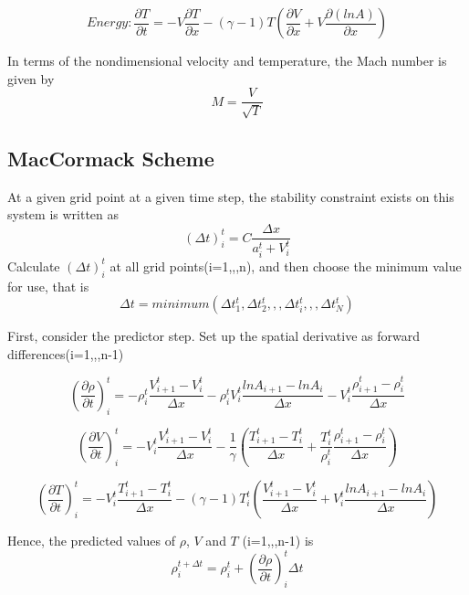 \begin{equation}
Energy: \frac{\partial T}{\partial t} = -V\frac{\partial T}{\partial x}-(\gamma -1)T( \frac{\partial V}{\partial x}+V\frac{\partial(ln A)}{\partial x} )
\end{equation}

In terms of the nondimensional velocity and temperature, the Mach number is given by
\begin{equation}
M = \frac{V}{\sqrt {T}}
\end{equation}

\subsection{MacCormack Scheme}

At a given grid point at a given time step, the stability constraint exists on this system is written as
\begin{equation}
(\Delta t)^t_i = C \frac{\Delta x}{a^t_i+V^t_i}
\end{equation}
Calculate $(\Delta t)^t_i$ at all grid points(i=1,,,n), and then choose the minimum value for use, that is
\begin{equation}
\Delta t =minimum( \Delta t^t_1, \Delta t^t_2,,, \Delta t^t_i,,,\Delta t^t_N )
\end{equation}

First, consider the predictor step. Set up the spatial derivative as forward differences(i=1,,,n-1)

\begin{equation}
(\frac{\partial \rho}{\partial t})^t_i=-\rho^t_i \frac{V^t_{i+1}-V^t_i}{\Delta x}-\rho^t_i V^t_i \frac{ln A_{i+1}-ln A_i}{\Delta x} -V^t_i \frac{\rho^t_{i+1} - \rho^t_i}{\Delta x}
\end{equation}

\begin{equation}
(\frac{\partial V}{\partial t})^t_i=-V^t_i \frac{V^t_{i+1}-V^t_i}{\Delta x}-\frac{1}{\gamma}( \frac{T^t_{i+1}-T^t_i}{\Delta x}+\frac{T^t_i}{\rho^t_i}\frac{\rho^t_{i+1}-\rho^t_i}{\Delta x}  )
\end{equation}

\begin{equation}
(\frac{\partial T}{\partial t})^t_i = -V^t_i \frac{T^t_{i+1}-T^t_i}{\Delta x}-(\gamma-1)T^t_i(\frac{V^t_{i+1}-V^t_i}{\Delta x}+V^t_i \frac{ln A_{i+1} - ln A_i}{\Delta x})
\end{equation}

Hence, the predicted values of $\rho$, $V$ and $T$ (i=1,,,n-1) is
\begin{equation}
\rho^{t+\Delta t}_i = \rho^t_i + (\frac{\partial \rho}{\partial t})^t_i \Delta t
\end{equation}

